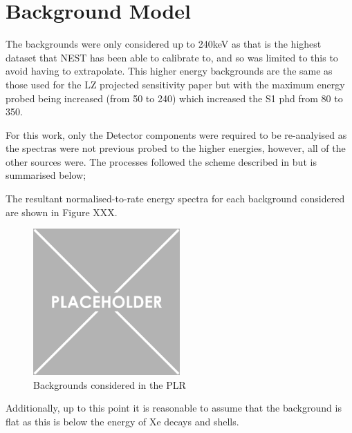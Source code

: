\section{Background Model}
\par
The backgrounds were only considered up to 240keV as that is the highest dataset that NEST has been able to calibrate to, and so was limited to this to avoid having to extrapolate.
This higher energy backgrounds are the same as those used for the LZ projected sensitivity paper \cite{LZ_projected_sensitivity_paper_ref} but with the maximum energy probed being increased (from 50 to 240) which increased the S1 phd from 80 to 350.

\par
For this work, only the Detector components were required to be re-analyised as the spectras were not previous probed to the higher energies, however, all of the other sources were.
The processes followed the scheme described in \cite{LZ_projected_sensitivity_paper_ref} but is summarised below;



\par
The resultant normalised-to-rate energy spectra for each background considered are shown in Figure XXX.

\begin{figure}[!htbp]
    \centering
    \includegraphics[width=0.5\textwidth]{Figures/Placeholder.png}
    \caption{Backgrounds considered in the PLR}
    \label{fig:sensitivity_paper_backgrounds}
\end{figure}


\par
Additionally, up to this point it is reasonable to assume that the background is flat as this is below the energy of Xe decays and shells.